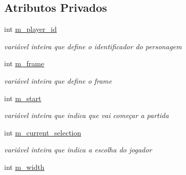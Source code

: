 \subsection*{Atributos Privados}
\begin{DoxyCompactItemize}
\item 
\mbox{\label{classCharacterSelection_a952c2ea6bcda9f86e5af153180c4e1ff}} 
int \mbox{\hyperlink{classCharacterSelection_a952c2ea6bcda9f86e5af153180c4e1ff}{m\+\_\+player\+\_\+id}}
\begin{DoxyCompactList}\small\item\em variável inteira que define o identificador do personagem \end{DoxyCompactList}\item 
\mbox{\label{classCharacterSelection_aa55f4689637450838d51090e921e036f}} 
int \mbox{\hyperlink{classCharacterSelection_aa55f4689637450838d51090e921e036f}{m\+\_\+frame}}
\begin{DoxyCompactList}\small\item\em variável inteira que define o frame \end{DoxyCompactList}\item 
\mbox{\label{classCharacterSelection_a99178a5ff9afda03b0c19ca72ed9aa41}} 
int \mbox{\hyperlink{classCharacterSelection_a99178a5ff9afda03b0c19ca72ed9aa41}{m\+\_\+start}}
\begin{DoxyCompactList}\small\item\em variável inteira que indica que vai começar a partida \end{DoxyCompactList}\item 
\mbox{\label{classCharacterSelection_a85f71f1b73dc6b86bcbc29eadd3a9ad7}} 
int \mbox{\hyperlink{classCharacterSelection_a85f71f1b73dc6b86bcbc29eadd3a9ad7}{m\+\_\+current\+\_\+selection}}
\begin{DoxyCompactList}\small\item\em variável inteira que indica a escolha do jogador \end{DoxyCompactList}\item 
\mbox{\label{classCharacterSelection_a7a360b0a1d33063f37ff160cefbf75c8}} 
int \mbox{\hyperlink{classCharacterSelection_a7a360b0a1d33063f37ff160cefbf75c8}{m\+\_\+width}}

\end{DoxyCompactItemize}
